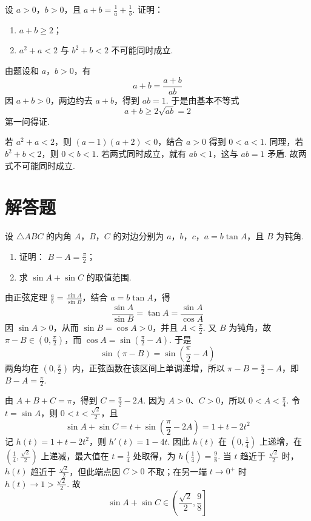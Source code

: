\reuseproblemnumber
\begin{problem}[III]
设 \(a > 0\)，\(b > 0\)，且 \(a + b = \frac{1}{a} + \frac{1}{b}\). 证明：

\begin{enumerate}
\item \(a + b \geqslant 2\)；
\item \(a^2 + a < 2\) 与 \(b^2 + b < 2\) 不可能同时成立.
\end{enumerate}
\end{problem}

\begin{solution}
由题设和 \(a\)，\(b>0\)，有
\[
a+b=\frac{a+b}{ab}
\]
因 \(a+b>0\)，两边约去 \(a+b\)，得到 \(ab=1\). 于是由基本不等式
\[
a+b\geqslant2\sqrt{ab}=2
\]
第一问得证.

若 \(a^2+a<2\)，则 \((a-1)(a+2)<0\)，结合 \(a>0\) 得到 \(0<a<1\). 同理，若 \(b^2+b<2\)，则 \(0<b<1\). 若两式同时成立，就有 \(ab<1\)，这与 \(ab=1\) 矛盾. 故两式不可能同时成立.
\end{solution}

\section{解答题}

\begin{problem}
设 \(\triangle ABC\) 的内角 \(A\)，\(B\)，\(C\) 的对边分别为 \(a\)，\(b\)，\(c\)，\(a = b \tan A\)，且 \(B\) 为钝角.

\begin{enumerate}
\item 证明： \( B - A = \frac{\pi}{2} \)；
\item 求 \( \sin A + \sin C \) 的取值范围.
\end{enumerate}
\end{problem}

\begin{solution}
由正弦定理 \(\frac{a}{b}=\frac{\sin A}{\sin B}\)，结合 \(a=b\tan A\)，得
\[
\frac{\sin A}{\sin B}=\tan A=\frac{\sin A}{\cos A}
\]
因 \(\sin A>0\)，从而 \(\sin B=\cos A>0\)，并且 \(A<\frac{\pi}{2}\). 又 \(B\) 为钝角，故 \(\pi-B\in(0,\frac{\pi}{2})\)，而 \(\cos A=\sin(\frac{\pi}{2}-A)\). 于是
\[
\sin(\pi-B)=\sin(\frac{\pi}{2}-A)
\]
两角均在 \((0,\frac{\pi}{2})\) 内，正弦函数在该区间上单调递增，所以 \(\pi-B=\frac{\pi}{2}-A\)，即 \(B-A=\frac{\pi}{2}\).

由 \(A+B+C=\pi\)，得到 \(C=\frac{\pi}{2}-2A\). 因为 \(A>0\)、\(C>0\)，所以 \(0<A<\frac{\pi}{4}\). 令 \(t=\sin A\)，则 \(0<t<\frac{\sqrt2}{2}\)，且
\[
\sin A+\sin C=t+\sin\left(\frac\pi2-2A\right)=1+t-2t^2
\]
记 \(h(t)=1+t-2t^2\)，则 \(h'(t)=1-4t\). 因此 \(h(t)\) 在 \((0,\frac{1}{4})\) 上递增，在 \((\frac{1}{4},\frac{\sqrt2}{2})\) 上递减，最大值在 \(t=\frac{1}{4}\) 处取得，为 \(h(\frac{1}{4})=\frac{9}{8}\). 当 \(t\) 趋近于 \(\frac{\sqrt2}{2}\) 时，\(h(t)\) 趋近于 \(\frac{\sqrt2}{2}\)，但此端点因 \(C>0\) 不取；在另一端 \(t\to0^+\) 时 \(h(t)\to1>\frac{\sqrt2}{2}\). 故
\[
\sin A+\sin C\in\left(\frac{\sqrt2}{2},\frac98\right]
\]
\end{solution}

